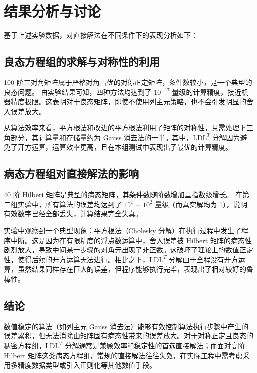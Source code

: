 \documentclass[a4paper,11pt]{article}
\begin{document}
\section{结果分析与讨论}

基于上述实验数据，对直接解法在不同条件下的表现分析如下：

\subsection{良态方程组的求解与对称性的利用}
100 阶三对角矩阵属于严格对角占优的对称正定矩阵，条件数较小，是一个典型的良态问题。
由实验结果可知，四种方法均达到了 $10^{-17}$ 量级的计算精度，接近机器精度极限。这表明对于良态矩阵，即使不使用列主元策略，也不会引发明显的舍入误差放大。

从算法效率来看，平方根法和改进的平方根法利用了矩阵的对称性，只需处理下三角部分，其计算量和存储量约为 Gauss 消去法的一半。其中，$\text{LDL}^T$ 分解因为避免了开方运算，运算效率更高，且在本组测试中表现出了最优的计算精度。

\subsection{病态方程组对直接解法的影响}
40 阶 Hilbert 矩阵是典型的病态矩阵，其条件数随阶数增加呈指数级增长。
在第二组实验中，所有算法的误差均达到了 $10^1 \sim 10^2$ 量级（而真实解均为 1），说明有效数字已经全部丢失，计算结果完全失真。

实验中观察到一个典型现象：平方根法（Cholesky 分解）在执行过程中发生了程序中断。这是因为在有限精度的浮点数运算中，舍入误差被 Hilbert 矩阵的病态性剧烈放大，导致中间某一步骤的对角元出现了非正数。这破坏了理论上的数值正定性，使得后续的开方运算无法进行。相比之下，$\text{LDL}^T$ 分解由于全程没有开方运算，虽然结果同样存在巨大的误差，但程序能够执行完毕，表现出了相对较好的鲁棒性。

\subsection{结论}
数值稳定的算法（如列主元 Gauss 消去法）能够有效控制算法执行步骤中产生的误差累积，但无法消除由矩阵固有病态性带来的误差放大。对于对称正定且良态的稠密方程组，$\text{LDL}^T$ 分解通常是兼顾效率和稳定性的首选直接解法；而面对高阶 Hilbert 矩阵这类病态方程组，常规的直接解法往往失效，在实际工程中需考虑采用多精度数据类型或引入正则化等其他数值手段。
\end{document}
